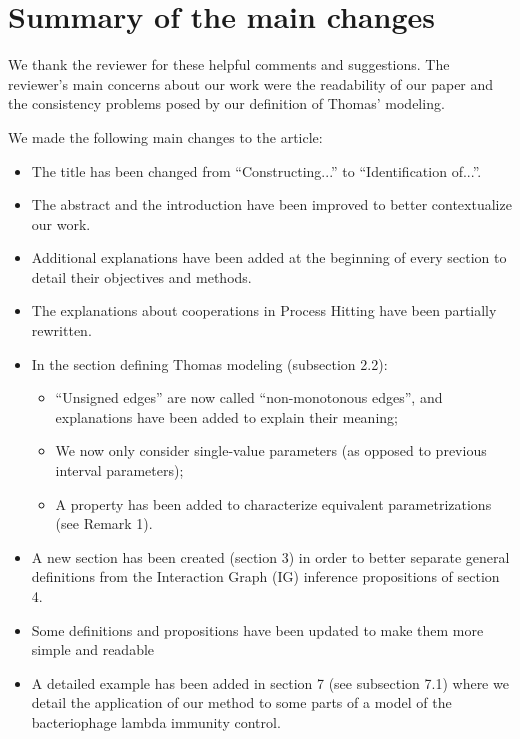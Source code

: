 \documentclass[11pt]{article}
\begin{document}
\section*{Summary of the main changes}

We thank the reviewer for these helpful comments and suggestions.
The reviewer's main concerns about our work were the readability of our paper and the consistency problems posed by our definition of Thomas' modeling.

We made the following main changes to the article:
\begin{itemize}
  \item The title has been changed from “Constructing...” to “Identification of...”.
  \item The abstract and the introduction have been improved to better contextualize our work.
  \item Additional explanations have been added at the beginning of every section
    to detail their objectives and methods.
  \item The explanations about cooperations in Process Hitting have been partially rewritten.
  \item In the section defining Thomas modeling (subsection 2.2):
    \begin{itemize}
      \item “Unsigned edges” are now called “non-monotonous edges”,
        and explanations have been added to explain their meaning;
      \item We now only consider single-value parameters
        (as opposed to previous interval parameters);
      \item A property has been added to characterize equivalent parametrizations
        (see Remark 1).
    \end{itemize}
  \item A new section has been created (section 3)
    in order to better separate general definitions 
    from the Interaction Graph (IG) inference propositions of section 4.
  \item Some definitions and propositions have been updated to make them more simple and readable
  \item A detailed example has been added in section 7 (see subsection 7.1)
    where we detail the application of our method to some parts of a model of
    the bacteriophage lambda immunity control.
\end{itemize}
\end{document}
